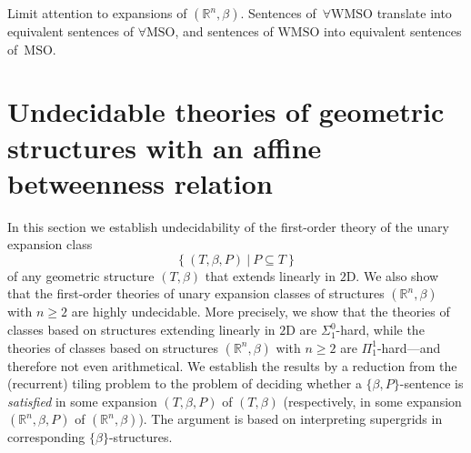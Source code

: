 \documentclass{LMCS}
\theoremstyle{plain}
\newcommand{\rp}{(\mathbb{R}^n,\beta)}
\newcommand{\rsq}{\mathbb{R}^n}
\begin{document}
%
\begin{cor}
%
Limit attention to expansions of $\rp$.
%
Sentences of\, $\forall\mathrm{WMSO}$ translate into
%
equivalent sentences of $\forall\mathrm{MSO}$,
%
and sentences of $\mathrm{WMSO}$ into equivalent sentences of\, $\mathrm{MSO}$. 
%
\end{cor}






\section{Undecidable theories of geometric structures with an affine betweenness relation}\label{main}



%
In this section we establish undecidability of the first-order
%
theory of the unary expansion class
%
%
%
$$\{\  (T,\beta,P)\ |\ P\subseteq T\ \}$$
%
%
%
of any geometric structure $(T,\beta)$ that extends linearly in $\mathrm{2D}$.
%
We also show that the first-order theories of
%
unary expansion classes of structures $(\rsq,\beta)$ with $n\geq 2$ are highly undecidable.
%
More precisely, we show that the theories of
%
classes based on structures extending linearly in $\mathrm{2D}$ are $\Sigma_1^0$-hard,
% 
while the theories of classes based on structures $(\rsq,\beta)$ with $n\geq 2$ are $\Pi_1^1$-hard---and therefore not even
%
 arithmetical. 
%
We establish the results by a reduction from the (recurrent) tiling problem to the problem of deciding
%
whether a $\{\beta,P\}$-sentence is \emph{satisfied} in some expansion $(T,\beta,P)$ of $(T,\beta)$ (respectively, in some expansion $(\rsq,\beta,P)$ of $\rp$).
%
The argument is based on interpreting supergrids in corresponding $\{\beta\}$-structures.
%
%
%
\end{document}
